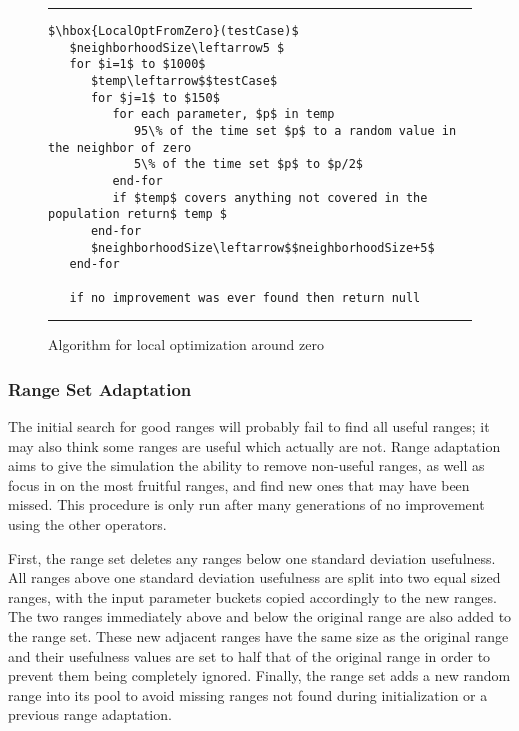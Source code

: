 \documentclass[runningheads]{llncs}
\begin{document}
\begin{figure}[h!]
\begin{center}
\hrule
\medskip
\begin{Verbatim}[fontfamily=tt, xleftmargin=10pt, commandchars=\\\{\},
codes={\catcode`$=3\catcode`^=7\catcode`_=8}]
$\hbox{LocalOptFromZero}(testCase)$
   $neighborhoodSize\leftarrow5 $
   for $i=1$ to $1000$ 
      $temp\leftarrow$$testCase$
      for $j=1$ to $150$
         for each parameter, $p$ in temp
            95\% of the time set $p$ to a random value in the neighbor of zero
            5\% of the time set $p$ to $p/2$
         end-for     
         if $temp$ covers anything not covered in the population return$ temp $
      end-for
      $neighborhoodSize\leftarrow$$neighborhoodSize+5$
   end-for
		
   if no improvement was ever found then return null
\end{Verbatim}
\hrule
\end{center}
\caption{Algorithm for local optimization around zero \label{fig:lcOptFZ}}
\end{figure}
\FloatBarrier


\subsubsection{Range Set Adaptation} The initial search for good ranges will probably fail to find all useful ranges; it may also think some ranges are useful which actually are not. Range adaptation aims to give the simulation the ability to remove non-useful ranges, as well as focus in on the most fruitful ranges, and find new ones that may have been missed. This procedure is only run after many generations of no improvement using the other operators.

First, the range set deletes any ranges below one standard deviation usefulness. All ranges above one standard deviation usefulness are split into two equal sized ranges, with the input parameter buckets copied accordingly to the new ranges. The two ranges immediately above and below the original range are also added to the range set. These new adjacent ranges have the same size as the original range and their usefulness values are set to half that of the original range in order to prevent them being completely ignored. Finally, the range set adds a new random range into its pool to avoid missing ranges not found during initialization or a previous range adaptation.
\end{document}
